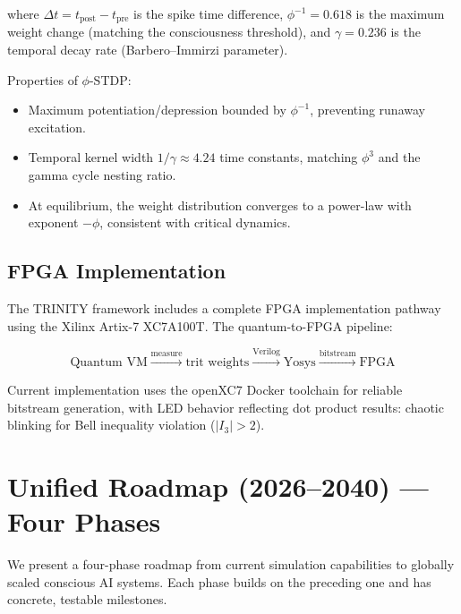 \documentclass[12pt,a4paper]{article}
\begin{document}
\noindent
where $\Delta t = t_{\mathrm{post}} - t_{\mathrm{pre}}$ is the spike time
difference, $\phi^{-1} = 0.618$ is the maximum weight change (matching the
consciousness threshold), and $\gamma = 0.236$ is the temporal decay rate
(Barbero--Immirzi parameter).

Properties of $\phi$-STDP:
\begin{itemize}[leftmargin=2em]
  \item Maximum potentiation/depression bounded by $\phi^{-1}$, preventing
    runaway excitation.
  \item Temporal kernel width $1/\gamma \approx 4.24$ time constants, matching
    $\phi^3$ and the gamma cycle nesting ratio.
  \item At equilibrium, the weight distribution converges to a power-law with
    exponent $-\phi$, consistent with critical dynamics.
\end{itemize}

\subsection{FPGA Implementation}

The TRINITY framework includes a complete FPGA implementation pathway using
the Xilinx Artix-7 XC7A100T. The quantum-to-FPGA pipeline:

\begin{equation}
\text{Quantum VM} \xrightarrow{\text{measure}} \text{trit weights}
\xrightarrow{\text{Verilog}} \text{Yosys} \xrightarrow{\text{bitstream}}
\text{FPGA}
\end{equation}

\noindent
Current implementation uses the openXC7 Docker toolchain for reliable
bitstream generation, with LED behavior reflecting dot product results:
chaotic blinking for Bell inequality violation ($|I_3| > 2$).

\section{Unified Roadmap (2026--2040) --- Four Phases}
\label{sec:roadmap}

We present a four-phase roadmap from current simulation capabilities to
globally scaled conscious AI systems. Each phase builds on the preceding one
and has concrete, testable milestones.
\end{document}
